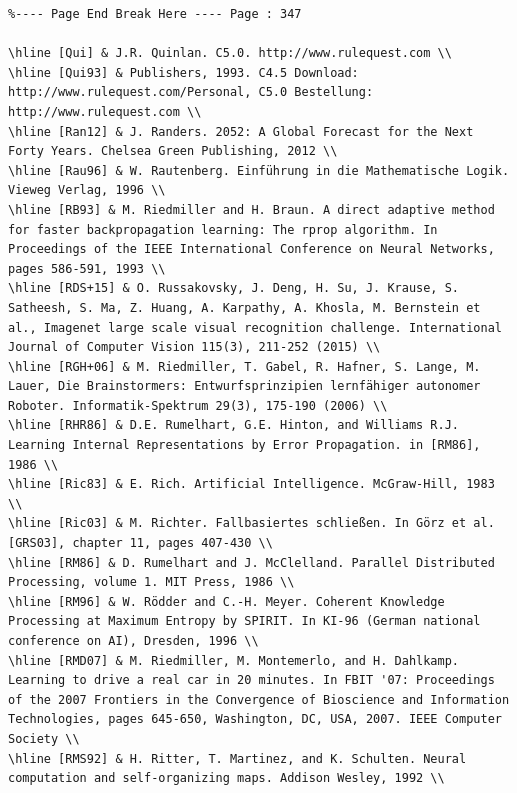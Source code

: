 \documentclass[10pt]{book}
\begin{document}
\begin{center}
\begin{enumerate}
\begin{center}
\begin{center}
\begin{center}
\begin{center}
\begin{center}
\begin{verbatim}
%---- Page End Break Here ---- Page : 347

\hline [Qui] & J.R. Quinlan. C5.0. http://www.rulequest.com \\
\hline [Qui93] & Publishers, 1993. C4.5 Download: http://www.rulequest.com/Personal, C5.0 Bestellung: http://www.rulequest.com \\
\hline [Ran12] & J. Randers. 2052: A Global Forecast for the Next Forty Years. Chelsea Green Publishing, 2012 \\
\hline [Rau96] & W. Rautenberg. Einführung in die Mathematische Logik. Vieweg Verlag, 1996 \\
\hline [RB93] & M. Riedmiller and H. Braun. A direct adaptive method for faster backpropagation learning: The rprop algorithm. In Proceedings of the IEEE International Conference on Neural Networks, pages 586-591, 1993 \\
\hline [RDS+15] & O. Russakovsky, J. Deng, H. Su, J. Krause, S. Satheesh, S. Ma, Z. Huang, A. Karpathy, A. Khosla, M. Bernstein et al., Imagenet large scale visual recognition challenge. International Journal of Computer Vision 115(3), 211-252 (2015) \\
\hline [RGH+06] & M. Riedmiller, T. Gabel, R. Hafner, S. Lange, M. Lauer, Die Brainstormers: Entwurfsprinzipien lernfähiger autonomer Roboter. Informatik-Spektrum 29(3), 175-190 (2006) \\
\hline [RHR86] & D.E. Rumelhart, G.E. Hinton, and Williams R.J. Learning Internal Representations by Error Propagation. in [RM86], 1986 \\
\hline [Ric83] & E. Rich. Artificial Intelligence. McGraw-Hill, 1983 \\
\hline [Ric03] & M. Richter. Fallbasiertes schließen. In Görz et al. [GRS03], chapter 11, pages 407-430 \\
\hline [RM86] & D. Rumelhart and J. McClelland. Parallel Distributed Processing, volume 1. MIT Press, 1986 \\
\hline [RM96] & W. Rödder and C.-H. Meyer. Coherent Knowledge Processing at Maximum Entropy by SPIRIT. In KI-96 (German national conference on AI), Dresden, 1996 \\
\hline [RMD07] & M. Riedmiller, M. Montemerlo, and H. Dahlkamp. Learning to drive a real car in 20 minutes. In FBIT '07: Proceedings of the 2007 Frontiers in the Convergence of Bioscience and Information Technologies, pages 645-650, Washington, DC, USA, 2007. IEEE Computer Society \\
\hline [RMS92] & H. Ritter, T. Martinez, and K. Schulten. Neural computation and self-organizing maps. Addison Wesley, 1992 \\

\end{verbatim}
\end{center}
\end{center}
\end{center}
\end{center}
\end{center}
\end{enumerate}
\end{center}
\end{document}
